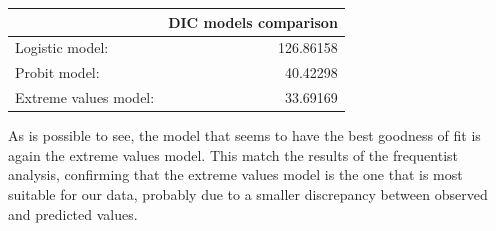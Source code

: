 \documentclass[]{article}
\newenvironment{Shaded}{\begin{snugshade}}{\end{snugshade}}
\newcommand{\DataTypeTok}[1]{\textcolor[rgb]{0.13,0.29,0.53}{#1}}
\newcommand{\DecValTok}[1]{\textcolor[rgb]{0.00,0.00,0.81}{#1}}
\newcommand{\KeywordTok}[1]{\textcolor[rgb]{0.13,0.29,0.53}{\textbf{#1}}}
\newcommand{\NormalTok}[1]{#1}
\newcommand{\OperatorTok}[1]{\textcolor[rgb]{0.81,0.36,0.00}{\textbf{#1}}}
\newcommand{\StringTok}[1]{\textcolor[rgb]{0.31,0.60,0.02}{#1}}
\begin{document}
\begin{Shaded}
\end{Shaded}

\begin{table}[!h]
\centering
\begin{tabular}{lr}
\toprule
  & DIC models comparison\\
\midrule
\rowcolor{gray!6}  Logistic model: & 126.86158\\
Probit model: & 40.42298\\
\rowcolor{gray!6}  Extreme values model: & 33.69169\\
\bottomrule
\end{tabular}
\end{table}

As is possible to see, the model that seems to have the best goodness of
fit is again the extreme values model. This match the results of the
frequentist analysis, confirming that the extreme values model is the
one that is most suitable for our data, probably due to a smaller
discrepancy between observed and predicted values.
\end{document}
